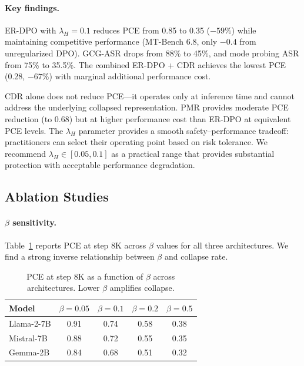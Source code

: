 \paragraph{Key findings.} ER-DPO with $\lambda_H = 0.1$ reduces PCE from 0.85 to 0.35 ($-59\%$) while maintaining competitive performance (MT-Bench 6.8, only $-0.4$ from unregularized DPO). GCG-ASR drops from 88\% to 45\%, and mode probing ASR from 75\% to 35.5\%. The combined ER-DPO + CDR achieves the lowest PCE (0.28, $-67\%$) with marginal additional performance cost.

CDR alone does not reduce PCE---it operates only at inference time and cannot address the underlying collapsed representation. PMR provides moderate PCE reduction (to 0.68) but at higher performance cost than ER-DPO at equivalent PCE levels. The $\lambda_H$ parameter provides a smooth safety--performance tradeoff: practitioners can select their operating point based on risk tolerance. We recommend $\lambda_H \in [0.05, 0.1]$ as a practical range that provides substantial protection with acceptable performance degradation.

\subsection{Ablation Studies}
\label{sec:ablations}

\paragraph{$\beta$ sensitivity.} Table~\ref{tab:beta_ablation} reports PCE at step 8K across $\beta$ values for all three architectures. We find a strong inverse relationship between $\beta$ and collapse rate.

\begin{table}[t]
\centering
\caption{PCE at step 8K as a function of $\beta$ across architectures. Lower $\beta$ amplifies collapse.}
\label{tab:beta_ablation}
\small
\begin{tabular}{@{}lcccc@{}}
\toprule
Model & $\beta = 0.05$ & $\beta = 0.1$ & $\beta = 0.2$ & $\beta = 0.5$ \\
\midrule
Llama-2-7B  & 0.91 & 0.74 & 0.58 & 0.38 \\
Mistral-7B  & 0.88 & 0.72 & 0.55 & 0.35 \\
Gemma-2B    & 0.84 & 0.68 & 0.51 & 0.32 \\
\bottomrule
\end{tabular}
\end{table}

